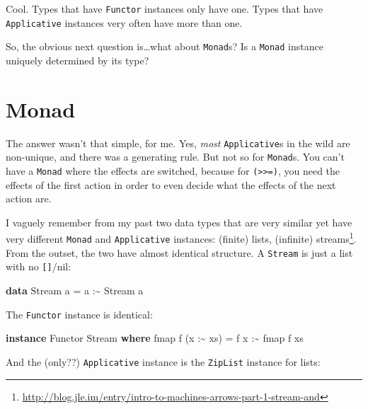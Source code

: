\documentclass[]{article}
\newenvironment{Shaded}{}{}
\newcommand{\DataTypeTok}[1]{\textcolor[rgb]{0.56,0.13,0.00}{#1}}
\newcommand{\FunctionTok}[1]{\textcolor[rgb]{0.02,0.16,0.49}{#1}}
\newcommand{\KeywordTok}[1]{\textcolor[rgb]{0.00,0.44,0.13}{\textbf{#1}}}
\newcommand{\NormalTok}[1]{#1}
\newcommand{\OperatorTok}[1]{\textcolor[rgb]{0.40,0.40,0.40}{#1}}
\newcommand{\OtherTok}[1]{\textcolor[rgb]{0.00,0.44,0.13}{#1}}
\renewcommand{\href}[2]{#2\footnote{\url{#1}}}
\begin{document}
Cool. Types that have \texttt{Functor} instances only have one. Types that have
\texttt{Applicative} instances very often have more than one.

So, the obvious next question is\ldots what about \texttt{Monad}s? Is a
\texttt{Monad} instance uniquely determined by its type?

\section{Monad}\label{monad}

The answer wasn't that simple, for me. Yes, \emph{most} \texttt{Applicative}s in
the wild are non-unique, and there was a generating rule. But not so for
\texttt{Monad}s. You can't have a \texttt{Monad} where the effects are switched,
because for \texttt{(\textgreater{}\textgreater{}=)}, you need the effects of
the first action in order to even decide what the effects of the next action
are.

I vaguely remember from my past two data types that are very similar yet have
very different \texttt{Monad} and \texttt{Applicative} instances: (finite)
lists, (infinite)
\href{http://blog.jle.im/entry/intro-to-machines-arrows-part-1-stream-and}{streams}.
From the outset, the two have almost identical structure. A \texttt{Stream} is
just a list with no \texttt{{[}{]}}/nil:

\begin{Shaded}
\begin{Highlighting}[]
\KeywordTok{data} \DataTypeTok{Stream}\NormalTok{ a }\OtherTok{=}\NormalTok{ a }\OperatorTok{:\textasciitilde{}} \DataTypeTok{Stream}\NormalTok{ a}
\end{Highlighting}
\end{Shaded}

The \texttt{Functor} instance is identical:

\begin{Shaded}
\begin{Highlighting}[]
\KeywordTok{instance} \DataTypeTok{Functor} \DataTypeTok{Stream} \KeywordTok{where}
    \FunctionTok{fmap}\NormalTok{ f (x }\OperatorTok{:\textasciitilde{}}\NormalTok{ xs) }\OtherTok{=}\NormalTok{ f x }\OperatorTok{:\textasciitilde{}} \FunctionTok{fmap}\NormalTok{ f xs}
\end{Highlighting}
\end{Shaded}

And the (only??) \texttt{Applicative} instance is the \texttt{ZipList} instance
for lists:
\end{document}
